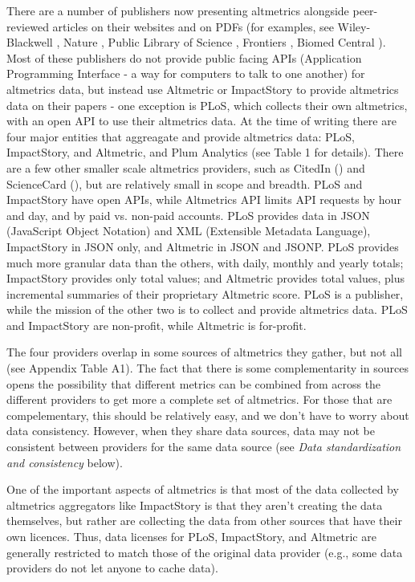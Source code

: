 \documentclass[letterpaper,superscriptaddress,showkeys,longbibliography]{revtex4-1}\usepackage{graphicx, color}
\newcommand{\ignore}[1]{}
\begin{document}
There are a number of publishers now presenting altmetrics alongside peer-reviewed articles on their websites and on PDFs (for examples, see Wiley-Blackwell \cite{wiley}, Nature \cite{nature}, Public Library of Science \cite{plos}, Frontiers \cite{frontiers}, Biomed Central \cite{bmcentral}). Most of these publishers do not provide public facing APIs (Application Programming Interface - a way for computers to talk to one another) for altmetrics data, but instead use Altmetric or ImpactStory to provide altmetrics data on their papers - one exception is PLoS, which collects their own altmetrics, with an open API to use their altmetrics data. At the time of writing there are four major entities that aggreagate and provide altmetrics data: PLoS, ImpactStory, and Altmetric, and Plum Analytics (see Table 1 for details). \ignore{Plum Analytics does not have an open public facing interface or API, so will not be discussed further.} There are a few other smaller scale altmetrics providers, such as CitedIn (\cite{citedin}) and ScienceCard (\cite{sciencecard}), but are relatively small in scope and breadth. PLoS and ImpactStory have open APIs, while Altmetrics API limits API requests by hour and day, and by paid vs. non-paid accounts. PLoS provides data in JSON (JavaScript Object Notation) and XML (Extensible Metadata Language), ImpactStory in JSON only, and Altmetric in JSON and JSONP. PLoS provides much more granular data than the others, with daily, monthly and yearly totals; ImpactStory provides only total values; and Altmetric provides total values, plus incremental summaries of their proprietary Altmetric score. PLoS is a publisher, while the mission of the other two is to collect and provide altmetrics data. PLoS and ImpactStory are non-profit, while Altmetric is for-profit.

The four providers overlap in some sources of altmetrics they gather, but not all (see Appendix Table A1). The fact that there is some complementarity in sources opens the possibility that different metrics can be combined from across the different providers to get more a complete set of altmetrics. For those that are compelementary, this should be relatively easy, and we don't have to worry about data consistency. However, when they share data sources, data may not be consistent between providers for the same data source (see \emph{Data standardization and consistency} below).

One of the important aspects of altmetrics is that most of the data collected by altmetrics aggregators like ImpactStory is that they aren't creating the data themselves, but rather are collecting the data from other sources that have their own licences. Thus, data licenses for PLoS, ImpactStory, and Altmetric are generally restricted to match those of the original data provider (e.g., some data providers do not let anyone to cache data). 
\end{document}
